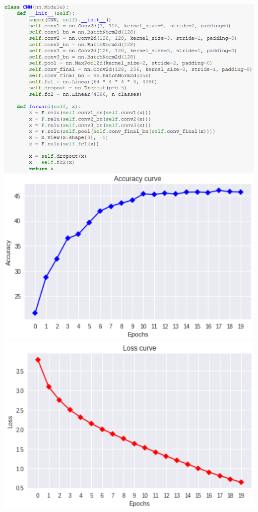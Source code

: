 \documentclass[11pt]{article}
\makeatletter
\def\maxwidth{\ifdim\Gin@nat@width>\linewidth\linewidth
  \else\Gin@nat@width\fi}
\let\Oldincludegraphics\includegraphics
\renewcommand{\includegraphics}[1]{\Oldincludegraphics[width=.8\maxwidth]{#1}}
\makeatother
\begin{document}
\begin{center}
  \includegraphics{2_class.png}\newline
  \includegraphics{2_acc.png}
  \includegraphics{2_loss.png}
\end{center}
\end{document}

